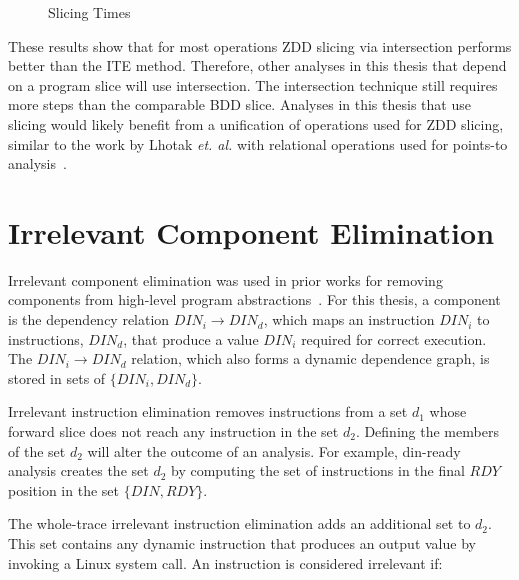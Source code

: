 \documentclass[defaultstyle,11pt]{thesis}
\begin{document}
\begin{figure}
  \centering
  \label{fig:slicing}
  \caption[Slicing times]{Slicing Times}
\end{figure}

These results show that for most operations ZDD slicing via
intersection performs better than the ITE method.  Therefore, other
analyses in this thesis that depend on a program slice will use
intersection.  The intersection technique still requires more steps
than the comparable BDD slice.  Analyses in this thesis that use
slicing would likely benefit from a unification of operations used for
ZDD slicing, similar to the work by Lhotak \textit{et. al.} with relational
operations used for points-to analysis~\cite{lhotak:08:lcpc}.

\chapter{Irrelevant Component Elimination}
\label{chap:deadcode}

Irrelevant component elimination was used in prior works for removing
components from high-level program
abstractions~\cite{corbett:icsc:2000}.  For this thesis, a component
is the dependency relation $DIN_i \rightarrow DIN_d$, which maps an
instruction $DIN_i$ to instructions, $DIN_d$, that produce a value
$DIN_i$ required for correct execution.  The $DIN_i \rightarrow DIN_d$
relation, which also forms a dynamic dependence graph, is stored in
sets of $\{DIN_i,DIN_d\}$.

Irrelevant instruction elimination removes instructions from a set
$d_1$ whose forward slice does not reach any instruction in the set
$d_2$.  Defining the members of the set $d_2$ will alter the outcome of
an analysis.  For example, din-ready analysis creates the set $d_2$ by
computing the set of instructions in the final $RDY$ position in the
set $\{DIN,RDY\}$.

The whole-trace irrelevant instruction elimination adds an additional
set to $d_2$. This set contains any dynamic instruction that produces
an output value by invoking a Linux system call.  An instruction is
considered irrelevant if:
\end{document}
